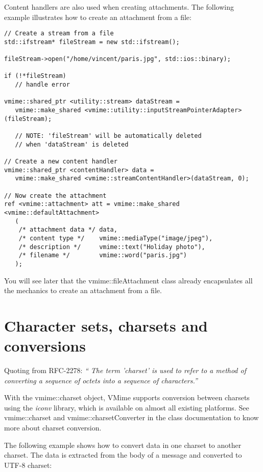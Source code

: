 Content handlers are also used when creating attachments. The following
example illustrates how to create an attachment from a file:

\begin{lstlisting}[caption={Creating an attachment from a file}]
// Create a stream from a file
std::ifstream* fileStream = new std::ifstream();

fileStream->open("/home/vincent/paris.jpg", std::ios::binary);

if (!*fileStream)
   // handle error

vmime::shared_ptr <utility::stream> dataStream =
   vmime::make_shared <vmime::utility::inputStreamPointerAdapter>(fileStream);

   // NOTE: 'fileStream' will be automatically deleted
   // when 'dataStream' is deleted

// Create a new content handler
vmime::shared_ptr <contentHandler> data =
   vmime::make_shared <vmime::streamContentHandler>(dataStream, 0);

// Now create the attachment
ref <vmime::attachment> att = vmime::make_shared <vmime::defaultAttachment>
   (
   	/* attachment data */ data,
	/* content type */    vmime::mediaType("image/jpeg"),
	/* description */     vmime::text("Holiday photo"),
	/* filename */        vmime::word("paris.jpg")
   );
\end{lstlisting}

You will see later that the {\vcode vmime::fileAttachment} class already
encapsulates all the mechanics to create an attachment from a file.


\section{Character sets, charsets and conversions\label{section_charsets}}

Quoting from RFC-2278: \emph{`` The term 'charset' is used to refer to a
method of converting a sequence of octets into a sequence of characters.''}

With the {\vcode vmime::charset} object, VMime supports conversion between
charsets using the {\em iconv} library, which is available on almost all
existing platforms. See {\vcode vmime::charset} and
{\vcode vmime::charsetConverter} in the class documentation to know more
about charset conversion.

The following example shows how to convert data in one charset to another
charset. The data is extracted from the body of a message and converted
to UTF-8 charset:


